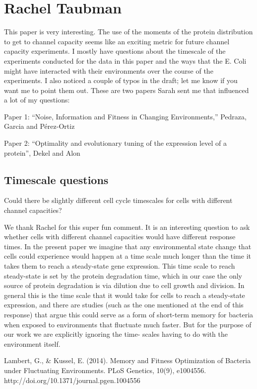 \section{Rachel Taubman}

This paper is very interesting. The use of the moments of the protein
distribution to get to channel capacity seems like an exciting metric for future
channel capacity experiments. I mostly have questions about the timescale of the
experiments conducted for the data in this paper and the ways that the E. Coli
might have interacted with their environments over the course of the
experiments. I also noticed a couple of typos in the draft; let me know if you
want me to point them out. These are two papers Sarah sent me that influenced a
lot of my questions:

Paper 1: “Noise, Information and Fitness in Changing Environments,” Pedraza,
Garcia and Pérez-Ortiz

Paper 2: “Optimality and evolutionary tuning of the expression level of a
protein”, Dekel and Alon

\subsection{Timescale questions}
\begin{tcolorbox}
Could there be slightly different cell cycle timescales for cells with different
channel capacities?
\end{tcolorbox}
We thank Rachel for this super fun comment. It is an interesting question to
ask whether cells with different channel capacities would have different
response times. In the present paper we imagine that any environmental state
change that cells could experience would happen at a time scale much longer than
the time it takes them to reach a steady-state gene expression. This time scale
to reach steady-state is set by the protein degradation time, which in our case
the only source of protein degradation is via dilution due to cell growth and
division. In general this is the time scale that it would take for cells to
reach a steady-state expression, and there are studies (such as the one
mentioned at the end of this response) that argue this could serve as a form of
short-term memory for bacteria when exposed to environments that fluctuate much
faster. But for the purpose of our work we are explicitly ignoring the time-
scales having to do with the environment itself.

Lambert, G., \& Kussel, E. (2014). Memory and Fitness Optimization of Bacteria
under Fluctuating Environments. PLoS Genetics, 10(9), e1004556.
http://doi.org/10.1371/journal.pgen.1004556

